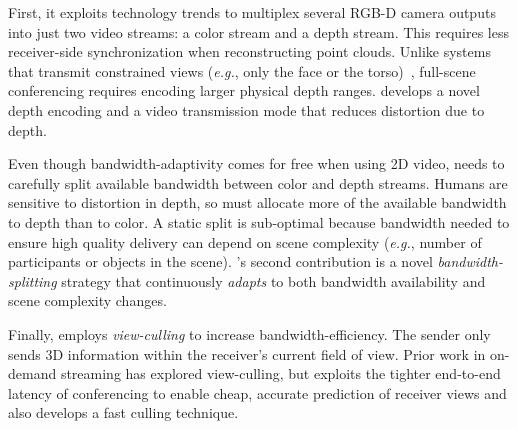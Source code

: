 %
First, it exploits technology trends to multiplex several RGB-D camera outputs into just two video streams: a color stream and a depth stream.
%
This requires less receiver-side synchronization when reconstructing point clouds.
%
Unlike systems that transmit constrained views (\textit{e.g.}, only the face or the torso)~\cite{starline,metastream}, full-scene conferencing requires encoding larger physical depth ranges.
%
\livo{} develops a novel depth encoding and a video transmission mode that reduces distortion due to depth.


Even though bandwidth-adaptivity comes for free when using 2D video, \livo{} needs to carefully split available bandwidth between color and depth streams.
%
%
Humans are sensitive to distortion in depth, so \livo{} must allocate more of the available bandwidth to depth than to color.
%
%
A static split is sub-optimal because bandwidth needed to ensure high quality delivery can depend on scene complexity (\textit{e.g.}, number of participants or objects in the scene).
%
\livo{}'s second contribution is a novel \textit{bandwidth-splitting} strategy that continuously \textit{adapts} to both bandwidth availability and scene complexity changes.

Finally, \livo{} employs \textit{view-culling} to increase bandwidth-efficiency.
%
The sender only sends 3D information within the receiver's current field of view.
%
Prior work in on-demand streaming has explored view-culling, but \livo{} exploits the tighter end-to-end latency of conferencing to enable cheap, accurate prediction of receiver views and also develops a fast culling technique.


